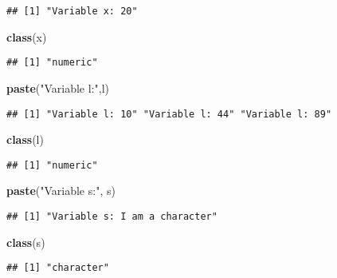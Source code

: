 \documentclass[
]{article}
\newenvironment{Shaded}{\begin{snugshade}}{\end{snugshade}}
\newcommand{\FunctionTok}[1]{\textcolor[rgb]{0.13,0.29,0.53}{\textbf{#1}}}
\newcommand{\NormalTok}[1]{#1}
\newcommand{\StringTok}[1]{\textcolor[rgb]{0.31,0.60,0.02}{#1}}
\begin{document}
\begin{verbatim}
## [1] "Variable x: 20"
\end{verbatim}

\begin{Shaded}
\begin{Highlighting}[]
\FunctionTok{class}\NormalTok{(x)}
\end{Highlighting}
\end{Shaded}

\begin{verbatim}
## [1] "numeric"
\end{verbatim}

\begin{Shaded}
\begin{Highlighting}[]
\FunctionTok{paste}\NormalTok{(}\StringTok{"Variable l:"}\NormalTok{,l)}
\end{Highlighting}
\end{Shaded}

\begin{verbatim}
## [1] "Variable l: 10" "Variable l: 44" "Variable l: 89"
\end{verbatim}

\begin{Shaded}
\begin{Highlighting}[]
\FunctionTok{class}\NormalTok{(l)}
\end{Highlighting}
\end{Shaded}

\begin{verbatim}
## [1] "numeric"
\end{verbatim}

\begin{Shaded}
\begin{Highlighting}[]
\FunctionTok{paste}\NormalTok{(}\StringTok{"Variable s:"}\NormalTok{, s)}
\end{Highlighting}
\end{Shaded}

\begin{verbatim}
## [1] "Variable s: I am a character"
\end{verbatim}

\begin{Shaded}
\begin{Highlighting}[]
\FunctionTok{class}\NormalTok{(s)}
\end{Highlighting}
\end{Shaded}

\begin{verbatim}
## [1] "character"
\end{verbatim}
\end{document}
